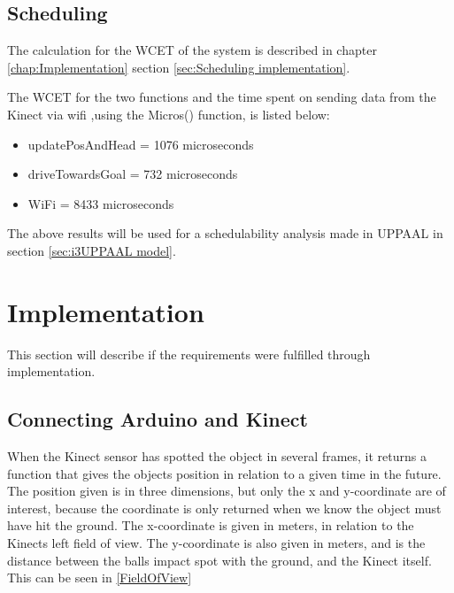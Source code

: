\subsection{Scheduling}
\label{sec:i3Scheduling}
The calculation for the WCET of the system is described in chapter \ref{chap:Implementation} section \ref{sec:Scheduling implementation}.

The WCET for the two functions and the time spent on sending data from the Kinect via wifi ,using the Micros() function, is listed below:
\begin{itemize}
	\item updatePosAndHead = 1076 microseconds
	\item driveTowardsGoal = 732 microseconds
	\item WiFi = 8433 microseconds
\end{itemize}

The above results will be used for a schedulability analysis made in UPPAAL in section \ref{sec:i3UPPAAL model}. 
\section{Implementation}
\label{sec:i3Implementation}
This section will describe if the requirements were fulfilled through implementation.

\subsection{Connecting Arduino and Kinect}
\label{sec:i3Connecting Arduino and Kinect implementation}

When the Kinect sensor has spotted the object in several frames, it returns a function that gives the objects position in relation to a given time in the future.
The position given is in three dimensions, but only the x and y-coordinate are of interest, because the coordinate is only returned when we know the object must have hit the ground. The x-coordinate is given in meters, in relation to the Kinects left field of view. The y-coordinate is also given in meters, and is the distance between the balls impact spot with the ground, and the Kinect itself. This can be seen in \ref{FieldOfView}

